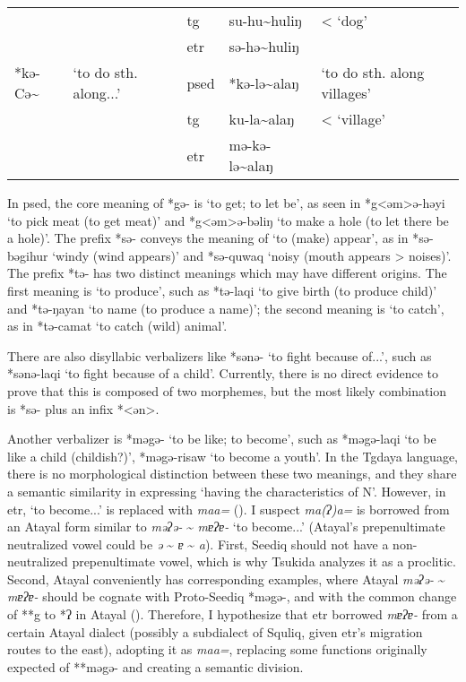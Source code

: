 \begin{table}[!htbp]
\begin{tabular}{lllll}
     &                    & \ac{tg}   & su-hu\~{}huliŋ   & \quad < `dog'                           \\
     &                    & \ac{etr}  & sə-hə\~{}huliŋ   &                            \\ \hline
*kə-Cə\~{} & `to do sth. along...'     & \ac{psed} & *kə-lə\~{}alaŋ  & `to do sth. along villages'      \\
     &                    & \ac{tg}   & ku-la\~{}alaŋ    & \quad < `village'                           \\
     &                    & \ac{etr}  & mə-kə-lə\~{}alaŋ &                            \\ \hline
\end{tabular}
\end{table}
\endgroup

In \acl{psed}, the core meaning of *gə- is `to get; to let be', as seen in *g<əm>ə-həyi `to pick meat (to get meat)' and *g<əm>ə-bəliŋ `to make a hole (to let there be a hole)'. The prefix *sə- conveys the meaning of `to (make) appear', as in *sə-bəgihur `windy (wind appears)' and *sə-quwaq `noisy (mouth appears > noises)'. The prefix *tə- has two distinct meanings which may have different origins. The first meaning is `to produce', such as *tə-laqi `to give birth (to produce child)' and *tə-ŋayan `to name (to produce a name)'; the second meaning is `to catch', as in *tə-camat `to catch (wild) animal'.

There are also disyllabic verbalizers like *sənə- `to fight because of...', such as *sənə-laqi `to fight because of a child'. Currently, there is no direct evidence to prove that this is composed of two morphemes, but the most likely combination is *sə- plus an infix *<ən>.

Another verbalizer is *məgə- `to be like; to become', such as *məgə-laqi `to be like a child (childish?)', *məgə-risaw `to become a youth'. In the Tgdaya language, there is no morphological distinction between these two meanings, and they share a semantic similarity in expressing `having the characteristics of N'. However, in \acl{etr}, `to become...' is replaced with \textit{maa=} (\cite{tsukida2009}). I suspect \textit{ma(ʔ)a=} is borrowed from an Atayal form similar to \textit{məʔə-} \~{} \textit{mɐʔɐ-} `to become...' (Atayal's prepenultimate neutralized vowel could be \textit{ə} \~{} \textit{ɐ} \~{} \textit{a}). First, Seediq should not have a non-neutralized prepenultimate vowel, which is why Tsukida analyzes it as a proclitic. Second, Atayal conveniently has corresponding examples, where Atayal \textit{məʔə-} \~{} \textit{mɐʔɐ-} should be cognate with Proto-Seediq *məgə-, and with the common change of **g to *ʔ in Atayal (\cite{goderich2020phd,song2024Aicg}). Therefore, I hypothesize that \acl{etr} borrowed \textit{mɐʔɐ-} from a certain Atayal dialect (possibly a subdialect of Squliq, given \acl{etr}'s migration routes to the east), adopting it as \textit{maa=}, replacing some functions originally expected of **məgə- and creating a semantic division.

